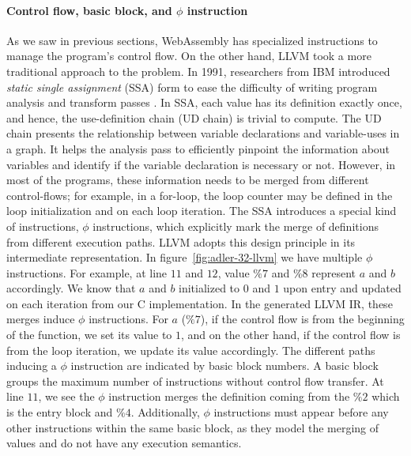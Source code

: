\paragraph{Control flow, basic block, and $\phi$ instruction}
As we saw in previous sections, WebAssembly has specialized instructions to
manage the program's control flow. On the other hand, LLVM took a more
traditional approach to the problem. In 1991, researchers from IBM introduced
\emph{static single assignment} (SSA) form to ease the difficulty of writing
program analysis and transform passes \cite{ibm-ssa}. In SSA, each value has its
definition exactly once, and hence, the use-definition chain (UD chain) is
trivial to compute. The UD chain presents the relationship between variable
declarations and variable-uses in a graph. It helps the analysis pass to
efficiently pinpoint the information about variables and identify if the
variable declaration is necessary or not. However, in most of the programs,
these information needs to be merged from different control-flows; for example,
in a for-loop, the loop counter may be defined in the loop initialization and on
each loop iteration. The SSA introduces a special kind of instructions, $\phi$
instructions, which explicitly mark the merge of definitions from different
execution paths. LLVM adopts this design principle in its intermediate
representation. In figure~\ref{fig:adler-32-llvm} we have multiple $\phi$
instructions. For example, at line $11$ and $12$, value $\%7$ and $\%8$
represent $a$ and $b$ accordingly. We know that $a$ and $b$ initialized to
$0$ and $1$ upon entry and updated on each iteration from our C implementation.
In the generated LLVM IR, these merges induce $\phi$ instructions. For $a$
($\%7$), if the control flow is from the beginning of the function, we set its
value to $1$, and on the other hand, if the control flow is from the loop
iteration, we update its value accordingly. The different paths inducing a
$\phi$ instruction are indicated by basic block numbers. A basic block groups
the maximum number of instructions without control flow transfer. At line $11$,
we see the $\phi$ instruction merges the definition coming from the $\%2$
which is the entry block and $\%4$. Additionally, $\phi$ instructions must
appear before any other instructions within the same basic block, as they model
the merging of values and do not have any execution semantics.

